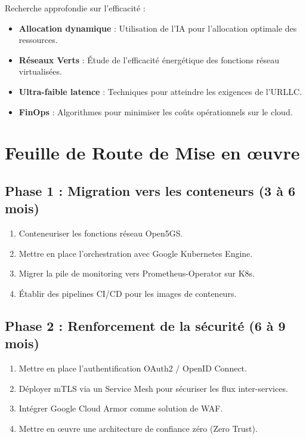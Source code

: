 \documentclass[12pt,a4paper]{report}
\begin{document}
Recherche approfondie sur l'efficacité :

\begin{itemize}
    \item \textbf{Allocation dynamique} : Utilisation de l'IA pour l'allocation optimale des ressources.
    \item \textbf{Réseaux Verts} : Étude de l'efficacité énergétique des fonctions réseau virtualisées.
    \item \textbf{Ultra-faible latence} : Techniques pour atteindre les exigences de l'URLLC.
    \item \textbf{FinOps} : Algorithmes pour minimiser les coûts opérationnels sur le cloud.
\end{itemize}

\section{Feuille de Route de Mise en œuvre}

\subsection{Phase 1 : Migration vers les conteneurs (3 à 6 mois)}
\begin{enumerate}
    \item Conteneuriser les fonctions réseau Open5GS.
    \item Mettre en place l'orchestration avec Google Kubernetes Engine.
    \item Migrer la pile de monitoring vers Prometheus-Operator sur K8s.
    \item Établir des pipelines CI/CD pour les images de conteneurs.
\end{enumerate}

\subsection{Phase 2 : Renforcement de la sécurité (6 à 9 mois)}
\begin{enumerate}
    \item Mettre en place l'authentification OAuth2 / OpenID Connect.
    \item Déployer mTLS via un Service Mesh pour sécuriser les flux inter-services.
    \item Intégrer Google Cloud Armor comme solution de WAF.
    \item Mettre en œuvre une architecture de confiance zéro (Zero Trust).
\end{enumerate}
\end{document}
